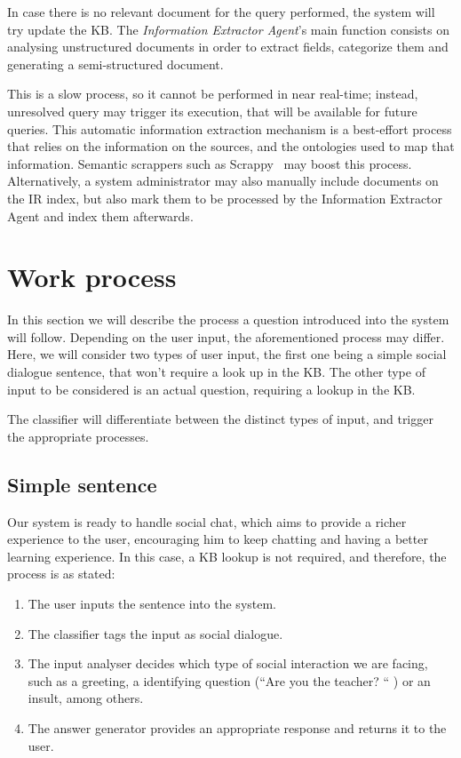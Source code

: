 In case there is no relevant document for the query performed, the system will try update the KB. The \emph{Information Extractor Agent}'s main function consists on analysing unstructured documents in order to extract fields, categorize them and generating a semi-structured document. 

This is a slow process, so it cannot be performed in near real-time; instead, unresolved query may trigger its execution, that will be available for future queries. This automatic information extraction mechanism is a best-effort process that relies on the information on the sources, and the ontologies used to map that information. Semantic scrappers such as Scrappy~\cite{villamor13} may boost this process. Alternatively, a system administrator may also manually include documents on the \ac{IR} index, but also mark them to be processed by the Information Extractor Agent and index them afterwards.

%
\section{Work process} %

In this section we will describe the process a question introduced into the system will follow. Depending on the user input, the aforementioned process may differ. Here, we will consider two types of user input, the first one being a simple social dialogue sentence, that won't require a look up in the \ac{KB}. The other type of input to be considered is an actual question, requiring a lookup in the \ac{KB}.


The classifier will differentiate between the distinct types of input, and trigger the appropriate processes.

\subsection{Simple sentence}

Our system is ready to handle social chat, which aims to provide a richer experience to the user, encouraging him to keep chatting and having a better learning experience. In this case, a \ac{KB} lookup is not required, and therefore, the process is as stated:

\begin{enumerate}
 \item The user inputs the sentence into the system.
 \item The classifier tags the input as social dialogue.
 \item The input analyser decides which type of social interaction we are facing, such as a greeting, a identifying question (``Are you the teacher? `` ) or an insult, among others.
 \item The answer generator provides an appropriate response and returns it to the user.
\end{enumerate}

